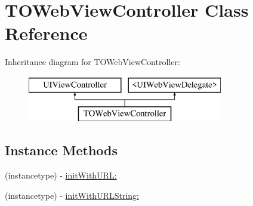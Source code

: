 \hypertarget{interface_t_o_web_view_controller}{}\section{T\+O\+Web\+View\+Controller Class Reference}
\label{interface_t_o_web_view_controller}
Inheritance diagram for T\+O\+Web\+View\+Controller\+:\begin{figure}[H]
\begin{center}
\leavevmode
\includegraphics[height=2.000000cm]{interface_t_o_web_view_controller}
\end{center}
\end{figure}
\subsection*{Instance Methods}
\begin{DoxyCompactItemize}
\item 
(instancetype) -\/ \hyperlink{interface_t_o_web_view_controller_a724ee402b4d5732c1ef57a1145b6448e}{init\+With\+U\+R\+L\+:}
\item 
(instancetype) -\/ \hyperlink{interface_t_o_web_view_controller_a1227f62d998de7c12f8bb3f1d2afea2f}{init\+With\+U\+R\+L\+String\+:}
\end{DoxyCompactItemize}
